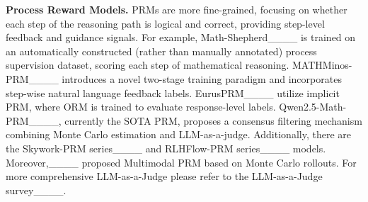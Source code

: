 \textbf{Process Reward Models.} PRMs are more fine-grained, focusing on whether each step of the reasoning path is logical and correct, providing step-level feedback and guidance signals. For example, Math-Shepherd____ is trained on an automatically constructed (rather than manually annotated) process supervision dataset, scoring each step of mathematical reasoning. MATHMinos-PRM____ introduces a novel two-stage training paradigm and incorporates step-wise natural language feedback labels. EurusPRM____ utilize implicit PRM, where ORM is trained to evaluate response-level labels. Qwen2.5-Math-PRM____, currently the SOTA PRM, proposes a consensus filtering mechanism combining Monte Carlo estimation and LLM-as-a-judge. Additionally, there are the Skywork-PRM series____ and RLHFlow-PRM series____ models. Moreover,____ proposed Multimodal PRM based on Monte Carlo rollouts. For more comprehensive LLM-as-a-Judge please refer to the LLM-as-a-Judge survey____.